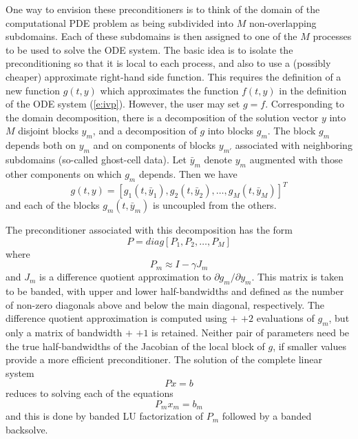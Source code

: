 One way to envision these preconditioners is to think of the domain of
the computational PDE problem as being subdivided into $M$ non-overlapping
subdomains.  Each of these subdomains is then assigned to one of the
$M$ processes to be used to solve the ODE system. The basic idea is
to isolate the preconditioning so that it is local to each process,
and also to use a (possibly cheaper) approximate right-hand side
function. This requires the definition of a new function $g(t,y)$
which approximates the function $f(t, y)$ in the definition of the ODE
system (\ref{e:ivp}). However, the user may set $g = f$.  Corresponding
to the domain decomposition, there is a decomposition of the solution
vector $y$ into $M$ disjoint blocks $y_m$, and a decomposition of $g$
into blocks $g_m$.  The block $g_m$ depends both on $y_m$ and on
components of blocks $y_{m'}$ associated with neighboring subdomains
(so-called ghost-cell data).  Let $\bar{y}_m$ denote $y_m$ augmented
with those other components on which $g_m$ depends.  Then we have
\begin{equation}
  g(t,y) = [g_1(t,\bar{y}_1), g_2(t,\bar{y}_2), \ldots, g_M(t,\bar{y}_M)]^T
\end{equation}
and each of the blocks $g_m(t, \bar{y}_m)$ is uncoupled from the others.

The preconditioner associated with this decomposition has the form 
\begin{equation}
  P= diag[P_1, P_2, \ldots, P_M]
\end{equation}
where 
\begin{equation}
  P_m \approx I - \gamma J_m
\end{equation}
and $J_m$ is a difference quotient approximation to 
$\partial g_m/\partial y_m$. This matrix is taken to be banded, with
upper and lower half-bandwidths  and  defined as
the number of non-zero diagonals above and below the main diagonal,
respectively. The difference quotient approximation is computed using
 $+$  $+ 2$ evaluations of $g_m$, but only a matrix
of bandwidth  $+$  $+ 1$ is retained. 
Neither pair of parameters need be the true half-bandwidths of the Jacobian of the
local block of $g$, if smaller values provide a more efficient
preconditioner. The solution of the complete linear system
\begin{equation}
  Px = b
\end{equation}
reduces to solving each of the equations 
\begin{equation}
  P_m x_m = b_m
\end{equation}
and this is done by banded LU factorization of $P_m$ followed by a banded
backsolve.

